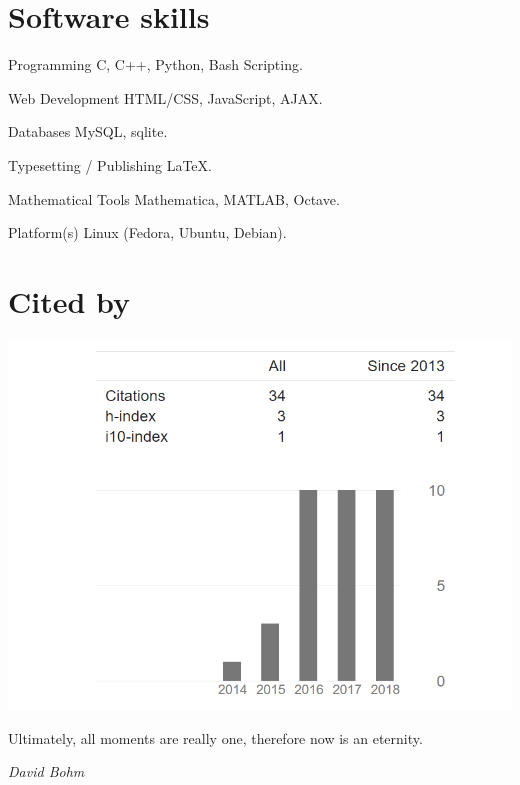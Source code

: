 \documentclass{tccv}
\begin{document}
\section{Software skills}

\begin{factlist}

\item{Programming}
     {C, C++, Python, Bash Scripting.}


\item{Web Development}
     {HTML/CSS, JavaScript, AJAX.}
     
\item{Databases}
	 {MySQL, sqlite.}
     
\item{Typesetting / Publishing}
	 {\LaTeX.}
 
\item{Mathematical Tools}
	 {Mathematica, MATLAB, Octave. }
     
\item{Platform(s)}
	 {Linux (Fedora, Ubuntu, Debian).}

\end{factlist}
\section{Cited by}
\includegraphics[scale=0.5]{citations.png}
\vspace{1.5in}
\epigraph{Ultimately, all moments are really one, therefore now is an eternity.}{\textit{David Bohm}}
\end{document}
